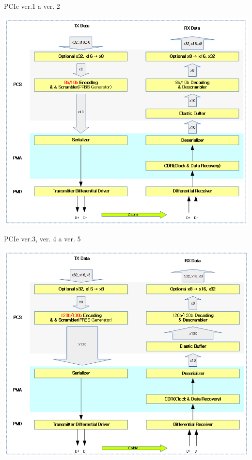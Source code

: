 \documentclass[aspectratio=43]{beamer}
\begin{document}
\begin{frame}{PCIe ver.1 a ver. 2}
	 
	\begin{center}
		\includegraphics[width=0.8\linewidth]{extrahovane_obrazky/img_2_page17_2.png}
	\end{center}
	
\end{frame}

\begin{frame}{PCIe ver.3, ver. 4 a ver. 5}
	 
	\begin{center}
		\includegraphics[width=0.8\linewidth]{extrahovane_obrazky/img_2_page20_0.png}
	\end{center}
	
\end{frame}
\end{document}
